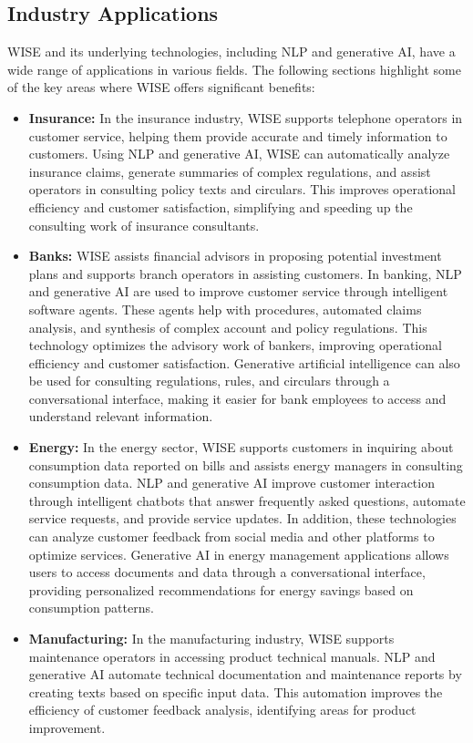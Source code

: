 \subsection{Industry Applications}

WISE and its underlying technologies, including NLP and generative AI, have a wide range of applications in various fields. The following sections highlight some of the key areas where WISE offers significant benefits:

\begin{itemize}
    \item \textbf{Insurance:} In the insurance industry, WISE supports telephone operators in customer service, helping them provide accurate and timely information to customers. Using NLP and generative AI, WISE can automatically analyze insurance claims, generate summaries of complex regulations, and assist operators in consulting policy texts and circulars. This improves operational efficiency and customer satisfaction, simplifying and speeding up the consulting work of insurance consultants.
    \item \textbf{Banks:} WISE assists financial advisors in proposing potential investment plans and supports branch operators in assisting customers. In banking, NLP and generative AI are used to improve customer service through intelligent software agents. These agents help with procedures, automated claims analysis, and synthesis of complex account and policy regulations. This technology optimizes the advisory work of bankers, improving operational efficiency and customer satisfaction.
    Generative artificial intelligence can also be used for consulting regulations, rules, and circulars through a conversational interface, making it easier for bank employees to access and understand relevant information.
    \item \textbf{Energy:} In the energy sector, WISE supports customers in inquiring about consumption data reported on bills and assists energy managers in consulting consumption data. NLP and generative AI improve customer interaction through intelligent chatbots that answer frequently asked questions, automate service requests, and provide service updates. In addition, these technologies can analyze customer feedback from social media and other platforms to optimize services.
    Generative AI in energy management applications allows users to access documents and data through a conversational interface, providing personalized recommendations for energy savings based on consumption patterns.
    \item \textbf{Manufacturing:} In the manufacturing industry, WISE supports maintenance operators in accessing product technical manuals. NLP and generative AI automate technical documentation and maintenance reports by creating texts based on specific input data. This automation improves the efficiency of customer feedback analysis, identifying areas for product improvement.  \cite{hpa2024}
\end{itemize}

